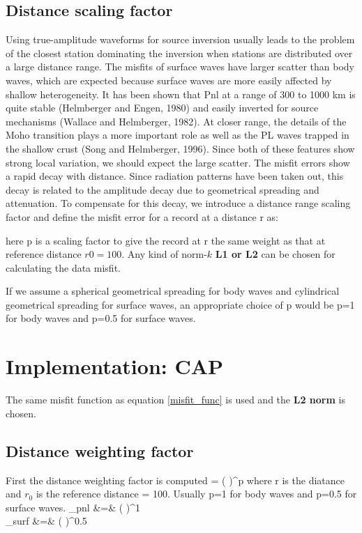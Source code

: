 \documentclass[11pt,titlepage,fleqn]{article}
\begin{document}
\subsection{Distance scaling factor}
Using true-amplitude waveforms for source inversion usually leads to the problem of the closest station dominating the inversion when stations are distributed over a large distance range. The misfits of surface waves have larger scatter than body waves, which are expected because surface waves are more easily affected by shallow heterogeneity. It has been shown that Pnl at a range of 300 to 1000 km is quite stable (Helmberger and Engen, 1980) and easily inverted for source mechanisms (Wallace and Helmberger, 1982). At closer range, the details of the Moho transition plays a more important role as well as the PL waves trapped in the shallow crust (Song and Helmberger, 1996). Since both of these features show strong local variation, we should expect the large scatter.  The misfit errors show a rapid decay with distance. Since radiation patterns have been taken out, this decay is related to the amplitude decay due to geometrical spreading and attenuation. To compensate for this decay, we introduce a distance range scaling factor and define the misfit error for a record at a distance r as:
\eq
{}
\label{misfit_func}
\en

here p is a scaling factor to give the record at r the same weight as that at reference distance $r0=100$. Any kind of norm-$k$ {\bf L1 or L2} can be chosen for calculating the data misfit. 

If we assume a spherical geometrical spreading for body waves and cylindrical geometrical spreading for surface waves, an appropriate choice of p would be p=1 for body waves and p=0.5 for surface waves.

\section{Implementation: CAP}
The same misfit function as equation \ref{misfit_func} is used and the {\bf L2 norm} is chosen.
\subsection{Distance weighting factor}
First the distance weighting factor is computed
\eq
\mu = \left(  \right)^p
\en
where r is the diatance and $r_0$ is the reference distance = 100. Usually p=1 for body waves and p=0.5 for surface waves.
\eqa
\mu_{pnl} &=& \left(  \right)^1\\
\mu_{surf} &=& \left(  \right)^{0.5}
\ena
\end{document}
